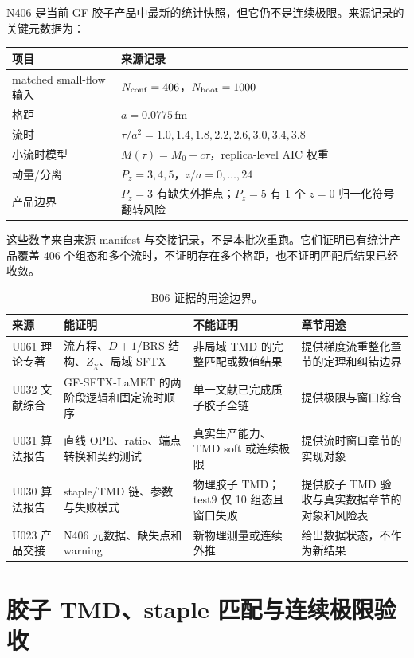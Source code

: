 N406 是当前 GF 胶子产品中最新的统计快照，但它仍不是连续极限。来源记录的关键元数据为：
\begin{center}
\small
\begin{tabularx}{\textwidth}{@{}lX@{}}
\toprule
项目 & 来源记录 \\
\midrule
matched small-flow 输入 & \(N_{\rm conf}=406\)，\(N_{\rm boot}=1000\) \\
格距 & \(a=0.0775\,\mathrm{fm}\) \\
流时 & \(\tau/a^2=1.0,1.4,1.8,2.2,2.6,3.0,3.4,3.8\) \\
小流时模型 & \(M(\tau)=M_0+c\tau\)，replica-level AIC 权重 \\
动量/分离 & \(P_z=3,4,5\)，\(z/a=0,\ldots,24\) \\
产品边界 & \(P_z=3\) 有缺失外推点；\(P_z=5\) 有 1 个 \(z=0\) 归一化符号翻转风险 \\
\bottomrule
\end{tabularx}
\end{center}
这些数字来自来源 manifest 与交接记录，不是本批次重跑。它们证明已有统计产品覆盖
406 个组态和多个流时，不证明存在多个格距，也不证明匹配后结果已经收敛。

\begin{table}[htbp]
\centering
\caption{B06 证据的用途边界。}
\label{tab:b06-evidence-boundaries}
\small
\begin{tabularx}{\textwidth}{@{}p{}p{}p{}X@{}}
\toprule
来源 & 能证明 & 不能证明 & 章节用途 \\
\midrule
U061 理论专著 & 流方程、\(D+1\)/BRS 结构、\(Z_\chi\)、局域 SFTX & 非局域 TMD 的完整匹配或数值结果 & 提供梯度流重整化章节的定理和纠错边界 \\
U032 文献综合 & GF-SFTX-LaMET 的两阶段逻辑和固定流时顺序 & 单一文献已完成质子胶子全链 & 提供极限与窗口综合 \\
U031 算法报告 & 直线 OPE、ratio、端点转换和契约测试 & 真实生产能力、TMD soft 或连续极限 & 提供流时窗口章节的实现对象 \\
U030 算法报告 & staple/TMD 链、参数与失败模式 & 物理胶子 TMD；test9 仅 10 组态且窗口失败 & 提供胶子 TMD 验收与真实数据章节的对象和风险表 \\
U023 产品交接 & N406 元数据、缺失点和 warning & 新物理测量或连续外推 & 给出数据状态，不作为新结果 \\
\bottomrule
\end{tabularx}
\end{table}

\chapter{胶子 TMD、staple 匹配与连续极限验收}
\label{sec:b06-tmd-continuum}

